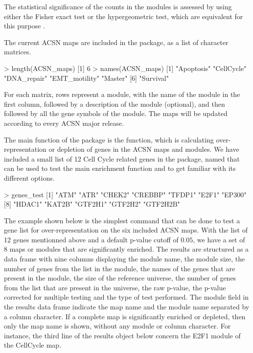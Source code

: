 The statistical significance of the counts in the modules is assessed by using
either the Fisher exact test \citep{fisher1922interpretation,
fisher1934statistical} or the hypergeometric test, which are equivalent for this
purpose \citep{rivals2007enrichment}.

The current ACSN maps are included in the  package, as a list of character matrices.

\begin{example}
> length(ACSN_maps)
[1] 6
> names(ACSN_maps)
[1] "Apoptosis"    "CellCycle"    "DNA_repair"   "EMT_motility" "Master" 
[6] "Survival"    
\end{example}

For each matrix, rows represent a module, with the name of the module in the
first column, followed by a description of the module (optional), and then
followed by all the gene symbols of the module. The maps will be updated
according to every ACSN major release.

The main function of the  package is the 
function, which is calculating over-representation or depletion of genes in the
ACSN maps and modules. We have included a small list of 12 Cell Cycle related
genes in the package, named  that can be used to test the main
enrichment function and to get familiar with its different options.

\begin{example}
> genes_test
 [1] "ATM"     "ATR"     "CHEK2"   "CREBBP"  "TFDP1"   "E2F1"    "EP300"  
 [8] "HDAC1"   "KAT2B"   "GTF2H1"  "GTF2H2"  "GTF2H2B"
\end{example}

The example shown below is the simplest command that can be done to test a gene
list for over-representation on the six included ACSN maps. With the list of 12
genes mentionned above and a default p-value cutoff of $0.05$, we have a set of
8 maps or modules that are significantly enriched. The results are structured
as a data frame with nine columns displaying the module name, the module size,
the number of genes from the list in the module, the names of the genes that are
present in the module, the size of the reference universe, the number of genes
from the list that are present in the universe, the raw p-value, the p-value
corrected for multiple testing and the type of test performed. The module field
in the results data frame indicate the map name and the module name separated by
a column character. If a complete map is significantly enriched or depleted,
then only the map name is shown, without any module or column character. For
instance, the third line of the results object below concern the E2F1 module of
the CellCycle map. 


